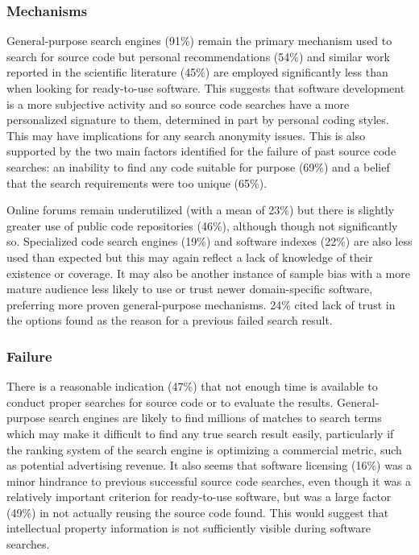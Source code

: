 \documentclass{casicswhitepaper}
\begin{document}
\subsubsection{Mechanisms}

General-purpose search engines (91\%) remain the primary mechanism used to search for source code but personal recommendations (54\%) and similar work reported in the scientific literature (45\%) are employed significantly less than when looking for ready-to-use software. This suggests that software development is a more subjective activity and so source code searches have a more personalized signature to them, determined in part by personal coding styles. This may have implications for any search anonymity issues. This is also supported by the two main factors identified for the failure of past source code searches: an inability to find any code suitable for purpose (69\%) and a belief that the search requirements were too unique (65\%).

Online forums remain underutilized (with a mean of 23\%) but there is slightly greater use of public code repositories (46\%), although though not significantly so. Specialized code search engines (19\%) and software indexes (22\%) are also less used than expected but this may again reflect a lack of knowledge of their existence or coverage. It may also be another instance of sample bias with a more mature audience less likely to use or trust newer domain-specific software, preferring more proven general-purpose mechanisms.
24\% cited lack of trust in the options found as the reason for a previous failed search result.

\subsubsection{Failure}

There is a reasonable indication (47\%) that not enough time is available to conduct proper searches for source code or to evaluate the results. General-purpose search engines are likely to find millions of matches to search terms which may make it difficult to find any true search result easily, particularly if the ranking system of the search engine is optimizing a commercial metric, such as potential advertising revenue. It also seems that software licensing (16\%) was a minor hindrance to previous successful source code searches, even though it was a relatively important criterion for ready-to-use software, but was a large factor (49\%) in not actually reusing the source code found. This would suggest that intellectual property information is not sufficiently visible during software searches.
\end{document}
